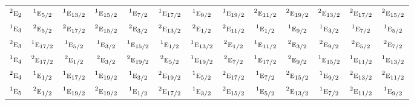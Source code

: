 \documentclass[10pt,a4paper]{article}
\numberwithin{equation}{section}
\newcommand{\irr}[1]{\text{\normalfont\scshape #1}}
\newcommand{\conjpair}[1]{{}^{#1}}
\begin{document}
{\begin{longtable}{@{}lcccccccccccc@{}}
$\conjpair{2}\irr{e}_{2}$ & $\conjpair{1}\irr{e}_{5/2}$ & $\conjpair{1}\irr{e}_{13/2}$ & $\conjpair{1}\irr{e}_{15/2}$ & $\conjpair{1}\irr{e}_{7/2}$ & $\conjpair{1}\irr{e}_{17/2}$ & $\conjpair{1}\irr{e}_{9/2}$ & $\conjpair{1}\irr{e}_{19/2}$ & $\conjpair{2}\irr{e}_{11/2}$ & $\conjpair{2}\irr{e}_{19/2}$ & $\conjpair{2}\irr{e}_{13/2}$ & $\conjpair{2}\irr{e}_{17/2}$ & $\conjpair{2}\irr{e}_{15/2}$\\
$\conjpair{1}\irr{e}_{3}$ & $\conjpair{2}\irr{e}_{5/2}$ & $\conjpair{2}\irr{e}_{17/2}$ & $\conjpair{2}\irr{e}_{15/2}$ & $\conjpair{2}\irr{e}_{3/2}$ & $\conjpair{2}\irr{e}_{13/2}$ & $\conjpair{2}\irr{e}_{1/2}$ & $\conjpair{2}\irr{e}_{11/2}$ & $\conjpair{1}\irr{e}_{1/2}$ & $\conjpair{1}\irr{e}_{9/2}$ & $\conjpair{1}\irr{e}_{3/2}$ & $\conjpair{1}\irr{e}_{7/2}$ & $\conjpair{1}\irr{e}_{5/2}$\\
$\conjpair{2}\irr{e}_{3}$ & $\conjpair{1}\irr{e}_{17/2}$ & $\conjpair{1}\irr{e}_{5/2}$ & $\conjpair{1}\irr{e}_{3/2}$ & $\conjpair{1}\irr{e}_{15/2}$ & $\conjpair{1}\irr{e}_{1/2}$ & $\conjpair{1}\irr{e}_{13/2}$ & $\conjpair{2}\irr{e}_{1/2}$ & $\conjpair{1}\irr{e}_{11/2}$ & $\conjpair{2}\irr{e}_{3/2}$ & $\conjpair{2}\irr{e}_{9/2}$ & $\conjpair{2}\irr{e}_{5/2}$ & $\conjpair{2}\irr{e}_{7/2}$\\
$\conjpair{1}\irr{e}_{4}$ & $\conjpair{2}\irr{e}_{17/2}$ & $\conjpair{2}\irr{e}_{1/2}$ & $\conjpair{2}\irr{e}_{3/2}$ & $\conjpair{2}\irr{e}_{19/2}$ & $\conjpair{2}\irr{e}_{5/2}$ & $\conjpair{1}\irr{e}_{19/2}$ & $\conjpair{2}\irr{e}_{7/2}$ & $\conjpair{1}\irr{e}_{17/2}$ & $\conjpair{2}\irr{e}_{9/2}$ & $\conjpair{1}\irr{e}_{15/2}$ & $\conjpair{1}\irr{e}_{11/2}$ & $\conjpair{1}\irr{e}_{13/2}$\\
$\conjpair{2}\irr{e}_{4}$ & $\conjpair{1}\irr{e}_{1/2}$ & $\conjpair{1}\irr{e}_{17/2}$ & $\conjpair{1}\irr{e}_{19/2}$ & $\conjpair{1}\irr{e}_{3/2}$ & $\conjpair{2}\irr{e}_{19/2}$ & $\conjpair{1}\irr{e}_{5/2}$ & $\conjpair{2}\irr{e}_{17/2}$ & $\conjpair{1}\irr{e}_{7/2}$ & $\conjpair{2}\irr{e}_{15/2}$ & $\conjpair{1}\irr{e}_{9/2}$ & $\conjpair{2}\irr{e}_{13/2}$ & $\conjpair{2}\irr{e}_{11/2}$\\
$\conjpair{1}\irr{e}_{5}$ & $\conjpair{2}\irr{e}_{1/2}$ & $\conjpair{1}\irr{e}_{19/2}$ & $\conjpair{2}\irr{e}_{19/2}$ & $\conjpair{1}\irr{e}_{1/2}$ & $\conjpair{2}\irr{e}_{17/2}$ & $\conjpair{1}\irr{e}_{3/2}$ & $\conjpair{2}\irr{e}_{15/2}$ & $\conjpair{1}\irr{e}_{5/2}$ & $\conjpair{2}\irr{e}_{13/2}$ & $\conjpair{1}\irr{e}_{7/2}$ & $\conjpair{2}\irr{e}_{11/2}$ & $\conjpair{1}\irr{e}_{9/2}$\\

\end{longtable}}
\end{document}

